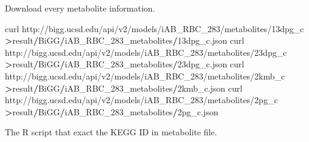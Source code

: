 \documentclass[
]{book}
\newenvironment{Shaded}{\begin{snugshade}}{\end{snugshade}}
\newcommand{\DecValTok}[1]{\textcolor[rgb]{0.00,0.00,0.81}{#1}}
\newcommand{\NormalTok}[1]{#1}
\newcommand{\SpecialCharTok}[1]{\textcolor[rgb]{0.81,0.36,0.00}{\textbf{#1}}}
\newcommand{\StringTok}[1]{\textcolor[rgb]{0.31,0.60,0.02}{#1}}
\begin{document}
Download every metabolite information.

\begin{Shaded}
\begin{Highlighting}[]
\NormalTok{curl }\StringTok{\textquotesingle{}http://bigg.ucsd.edu/api/v2/models/iAB\_RBC\_283/metabolites/13dpg\_c\textquotesingle{}}       \SpecialCharTok{\textgreater{}}\NormalTok{result}\SpecialCharTok{/}\NormalTok{BiGG}\SpecialCharTok{/}\NormalTok{iAB\_RBC\_283\_metabolites}\SpecialCharTok{/}\DecValTok{13}\NormalTok{dpg\_c.json}
\NormalTok{curl }\StringTok{\textquotesingle{}http://bigg.ucsd.edu/api/v2/models/iAB\_RBC\_283/metabolites/23dpg\_c\textquotesingle{}}       \SpecialCharTok{\textgreater{}}\NormalTok{result}\SpecialCharTok{/}\NormalTok{BiGG}\SpecialCharTok{/}\NormalTok{iAB\_RBC\_283\_metabolites}\SpecialCharTok{/}\DecValTok{23}\NormalTok{dpg\_c.json}
\NormalTok{curl }\StringTok{\textquotesingle{}http://bigg.ucsd.edu/api/v2/models/iAB\_RBC\_283/metabolites/2kmb\_c\textquotesingle{}}        \SpecialCharTok{\textgreater{}}\NormalTok{result}\SpecialCharTok{/}\NormalTok{BiGG}\SpecialCharTok{/}\NormalTok{iAB\_RBC\_283\_metabolites}\SpecialCharTok{/}\DecValTok{2}\NormalTok{kmb\_c.json}
\NormalTok{curl }\StringTok{\textquotesingle{}http://bigg.ucsd.edu/api/v2/models/iAB\_RBC\_283/metabolites/2pg\_c\textquotesingle{}} \SpecialCharTok{\textgreater{}}\NormalTok{result}\SpecialCharTok{/}\NormalTok{BiGG}\SpecialCharTok{/}\NormalTok{iAB\_RBC\_283\_metabolites}\SpecialCharTok{/}\DecValTok{2}\NormalTok{pg\_c.json}
\end{Highlighting}
\end{Shaded}

The R script that exact the KEGG ID in metabolite file.
\end{document}
